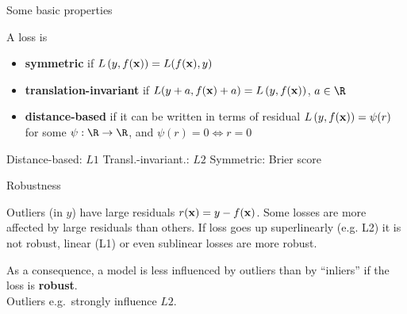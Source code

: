 \documentclass[11pt,compress,t,notes=noshow, xcolor=table]{beamer}
\begin{document}
\begin{frame}{Some basic properties}

A loss is  
\begin{itemize}
\item \textbf{symmetric} if $L\left(y, f(\mathbf{x})\right) = L(f(\mathbf{x}), y)$
\item \textbf{translation-invariant} if $L(y + a, f(\mathbf{x}) + a) = L\left(y, f(\mathbf{x})\right)$, 
$a \in \R$
\item \textbf{distance-based} if it can be written in terms of residual 
$L\left(y, f(\mathbf{x})\right) = \psi (r)$ for some $\psi: \R \to \R$, and 
$\psi(r) = 0 \Leftrightarrow r = 0$
\end{itemize}


\vfill

\splitVThree
{
\small \centering
Distance-based: $L1$
}%
{
\small \centering
Transl.-invariant.: $L2$
}%
{
\small \centering
Symmetric: Brier score
}

\end{frame}


\begin{frame2}[small]{Robustness}

Outliers (in $y$) have large residuals $r(\mathbf{x}) = y - f(\mathbf{x})$. Some losses are more
affected by large residuals than others. If loss goes up superlinearly (e.g. L2) it is not robust, linear (L1) or even sublinear losses are more robust.

\vfill

%
{
As a consequence, a model is less influenced by outliers than by ``inliers'' if 
the loss is \textbf{robust}.\\
Outliers e.g.\ strongly influence $L2$.
}%

\vfill


\end{frame2}
\end{document}
